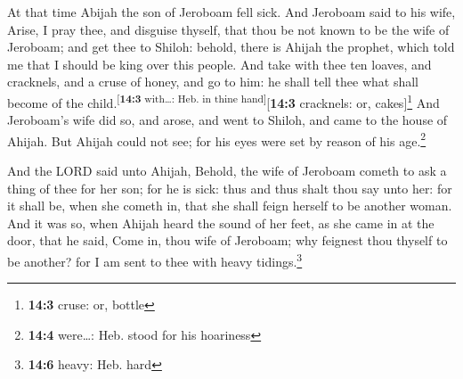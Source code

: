  At that time Abijah the son of Jeroboam fell sick.
 And Jeroboam said to his wife, Arise, I pray thee, and
disguise thyself, that thou be not known to be the wife of Jeroboam; and
get thee to Shiloh: behold, there is Ahijah the prophet, which told me
that I should be king over this people.  And take with
thee ten loaves, and cracknels, and a cruse of honey, and go to him: he
shall tell thee what shall become of the
child.\textsuperscript{{[}\textbf{14:3} with\ldots: Heb. in thine
hand{]}}{[}\textbf{14:3} cracknels: or, cakes{]}\footnote{\textbf{14:3}
  cruse: or, bottle}  And Jeroboam's wife did so, and
arose, and went to Shiloh, and came to the house of Ahijah. But Ahijah
could not see; for his eyes were set by reason of his age.\footnote{\textbf{14:4}
  were\ldots: Heb. stood for his hoariness}

 And the LORD said unto Ahijah, Behold, the wife of
Jeroboam cometh to ask a thing of thee for her son; for he is sick: thus
and thus shalt thou say unto her: for it shall be, when she cometh in,
that she shall feign herself to be another woman.  And it
was so, when Ahijah heard the sound of her feet, as she came in at the
door, that he said, Come in, thou wife of Jeroboam; why feignest thou
thyself to be another? for I am sent to thee with heavy
tidings.\footnote{\textbf{14:6} heavy: Heb. hard}

